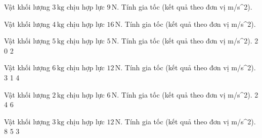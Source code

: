 \begin{bt}
Vật khối lượng $3\,\text{kg}$ chịu hợp lực $9\,\text{N}$. Tính gia tốc (kết quả theo đơn vị m/s^2).
\end{bt}

\begin{bt}
Vật khối lượng $4\,\text{kg}$ chịu hợp lực $16\,\text{N}$. Tính gia tốc (kết quả theo đơn vị m/s^2).
\end{bt}

\begin{ex}
Vật khối lượng $5\,\text{kg}$ chịu hợp lực $5\,\text{N}$. Tính gia tốc (kết quả theo đơn vị m/s^2).
\choice
{}
{2}
{0}
{2}
\end{ex}

\begin{ex}
Vật khối lượng $6\,\text{kg}$ chịu hợp lực $12\,\text{N}$. Tính gia tốc (kết quả theo đơn vị m/s^2).
\choice
{3}
{}
{1}
{4}
\end{ex}

\begin{ex}
Vật khối lượng $2\,\text{kg}$ chịu hợp lực $6\,\text{N}$. Tính gia tốc (kết quả theo đơn vị m/s^2).
\choice
{2}
{4}
{}
{6}
\end{ex}

\begin{ex}
Vật khối lượng $3\,\text{kg}$ chịu hợp lực $12\,\text{N}$. Tính gia tốc (kết quả theo đơn vị m/s^2).
\choice
{8}
{5}
{3}
{}
\end{ex}


